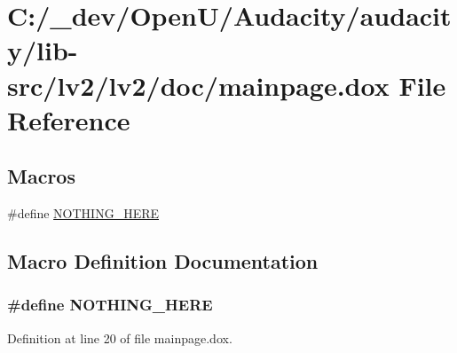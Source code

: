 \hypertarget{lv2_2lv2_2doc_2mainpage_8dox}{}\section{C\+:/\+\_\+dev/\+Open\+U/\+Audacity/audacity/lib-\/src/lv2/lv2/doc/mainpage.dox File Reference}
\label{lv2_2lv2_2doc_2mainpage_8dox}
\subsection*{Macros}
\begin{DoxyCompactItemize}
\item 
\#define \hyperlink{lv2_2lv2_2doc_2mainpage_8dox_ae5006d1634f8dcc64fc49eb1dd9861b7}{N\+O\+T\+H\+I\+N\+G\+\_\+\+H\+E\+RE}
\end{DoxyCompactItemize}


\subsection{Macro Definition Documentation}
\subsubsection[{\texorpdfstring{N\+O\+T\+H\+I\+N\+G\+\_\+\+H\+E\+RE}{NOTHING_HERE}}]{\setlength{\rightskip}{0pt plus 5cm}\#define N\+O\+T\+H\+I\+N\+G\+\_\+\+H\+E\+RE}\hypertarget{lv2_2lv2_2doc_2mainpage_8dox_ae5006d1634f8dcc64fc49eb1dd9861b7}{}\label{lv2_2lv2_2doc_2mainpage_8dox_ae5006d1634f8dcc64fc49eb1dd9861b7}


Definition at line 20 of file mainpage.\+dox.

